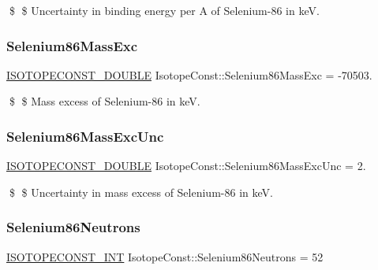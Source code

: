 \$ \$ Uncertainty in binding energy per A of Selenium-\/86 in keV. \mbox{\label{group___isotope_const-_selenium-_se86_gaee9990a9e074134186470c39c72d29df}} 
\subsubsection{\texorpdfstring{Selenium86\+Mass\+Exc}{Selenium86MassExc}}
{\footnotesize\ttfamily \mbox{\hyperlink{group___isotope_const-_macros_ga8f45a7272ce02c0b4c65c44636ed719a}{I\+S\+O\+T\+O\+P\+E\+C\+O\+N\+S\+T\+\_\+\+D\+O\+U\+B\+LE}} Isotope\+Const\+::\+Selenium86\+Mass\+Exc = -\/70503.}

\$ \$ Mass excess of Selenium-\/86 in keV. \mbox{\label{group___isotope_const-_selenium-_se86_ga6125f4ab7b27fcf665c62c24c06ac727}} 
\subsubsection{\texorpdfstring{Selenium86\+Mass\+Exc\+Unc}{Selenium86MassExcUnc}}
{\footnotesize\ttfamily \mbox{\hyperlink{group___isotope_const-_macros_ga8f45a7272ce02c0b4c65c44636ed719a}{I\+S\+O\+T\+O\+P\+E\+C\+O\+N\+S\+T\+\_\+\+D\+O\+U\+B\+LE}} Isotope\+Const\+::\+Selenium86\+Mass\+Exc\+Unc = 2.}

\$ \$ Uncertainty in mass excess of Selenium-\/86 in keV. \mbox{\label{group___isotope_const-_selenium-_se86_gaccb9b45e155718eee2739265b38ba413}} 
\subsubsection{\texorpdfstring{Selenium86\+Neutrons}{Selenium86Neutrons}}
{\footnotesize\ttfamily \mbox{\hyperlink{group___isotope_const-_macros_ga5f18360b3e99483a35c32d789e62621c}{I\+S\+O\+T\+O\+P\+E\+C\+O\+N\+S\+T\+\_\+\+I\+NT}} Isotope\+Const\+::\+Selenium86\+Neutrons = 52}


